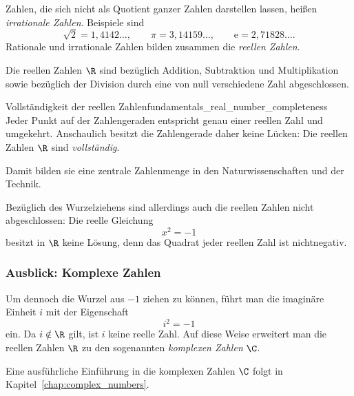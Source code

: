 Zahlen, die sich nicht als Quotient ganzer Zahlen darstellen lassen, heißen
\emph{irrationale Zahlen}. Beispiele sind
\[
  \sqrt2=1{,}4142\ldots,
  \qquad
  \pi=3{,}14159\ldots,
  \qquad
  \mathrm e=2{,}71828\ldots.
\]
Rationale und irrationale Zahlen bilden zusammen die \emph{reellen Zahlen}.

\begin{center}
  \begingroup
    \def\NumberSetStage{4}
  \endgroup
\end{center}

Die reellen Zahlen $\R$ sind bezüglich Addition, Subtraktion und Multiplikation
sowie bezüglich der Division durch eine von null verschiedene Zahl
abgeschlossen.

\begin{KeyPointBox}{Vollständigkeit der reellen Zahlen}{fundamentals_real_number_completeness}
  Jeder Punkt auf der Zahlengeraden entspricht genau einer reellen Zahl und
  umgekehrt. Anschaulich besitzt die Zahlengerade daher keine Lücken: Die
  reellen Zahlen $\R$ sind \emph{vollständig}.
  \begin{center}
  \end{center}
   Damit bilden sie eine zentrale Zahlenmenge in den Naturwissenschaften und der Technik.
\end{KeyPointBox}

Bezüglich des Wurzelziehens sind allerdings auch die reellen Zahlen nicht abgeschlossen:
Die reelle Gleichung
\[
  x^2=-1
\]
besitzt in $\R$ keine Lösung, denn das Quadrat jeder reellen Zahl ist
nichtnegativ.


\subsubsection{Ausblick: Komplexe Zahlen}
\label{subsubsec:fundamentals_complex_numbers}

Um dennoch die Wurzel aus $-1$ ziehen zu können, führt man die imaginäre
Einheit $i$ mit der Eigenschaft
\[
  i^2=-1
\]
ein. Da $i\notin\R$ gilt, ist $i$ keine reelle Zahl. Auf diese Weise erweitert
man die reellen Zahlen $\R$ zu den sogenannten \emph{komplexen Zahlen} $\C$.

\begin{center}
  \begingroup
    \def\NumberSetStage{5}
  \endgroup
\end{center}

Eine ausführliche Einführung in die komplexen Zahlen $\C$ folgt in
Kapitel~\ref{chap:complex_numbers}.
